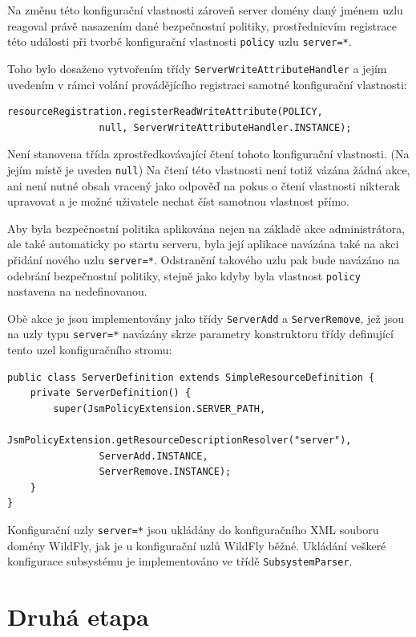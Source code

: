 Na změnu této konfigurační vlastnosti zároveň server domény daný jménem uzlu reagoval právě nasazením dané bezpečnostní politiky, prostřednicvím registrace této události při tvorbě konfigurační vlastnosti {\tt policy} uzlu {\tt server=*}.

Toho bylo dosaženo vytvořením třídy {\tt ServerWriteAttributeHandler} a jejím uvedením v rámci volání provádějícího registraci samotné konfigurační vlastnosti:

\begin{verbatim}
resourceRegistration.registerReadWriteAttribute(POLICY,
                null, ServerWriteAttributeHandler.INSTANCE);
\end{verbatim}

Není stanovena třída zprostředkovávající čtení tohoto konfigurační vlastnosti. (Na jejím místě je uveden {\tt null}) Na čtení této vlastnosti není totiž vázána žádná akce, ani není nutné obsah vracený jako odpověď na pokus o čtení vlastnosti nikterak upravovat a je možné uživatele nechat číst samotnou vlastnost přímo.

Aby byla bezpečnostní politika aplikována nejen na základě akce administrátora, ale také automaticky po startu serveru, byla její aplikace navázána také na akci přidání nového uzlu {\tt server=*}. Odstranění takového uzlu pak bude navázáno na odebrání bezpečnostní politiky, stejně jako kdyby byla vlastnost {\tt policy} nastavena na nedefinovanou.

Obě akce je jsou implementovány jako třídy {\tt ServerAdd} a {\tt ServerRemove}, jež jsou na uzly typu {\tt server=*} navázány skrze parametry konstruktoru třídy definující tento uzel konfiguračního stromu:

\begin{verbatim}
public class ServerDefinition extends SimpleResourceDefinition {
    private ServerDefinition() {
        super(JsmPolicyExtension.SERVER_PATH,
                JsmPolicyExtension.getResourceDescriptionResolver("server"),
                ServerAdd.INSTANCE,
                ServerRemove.INSTANCE);
    }
}
\end{verbatim}

Konfigurační uzly {\tt server=*} jsou ukládány do konfiguračního XML souboru domény WildFly, jak je u konfigurační uzlů WildFly běžné. Ukládání veškeré konfigurace subsystému je implementováno ve třídě {\tt SubsystemParser}.

\section{Druhá etapa}

